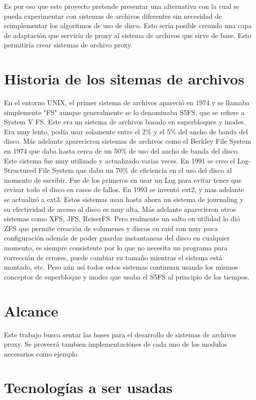 Es por eso que este proyecto pretende presentar una alternativa con la cual se pueda experimentar con sistemas de archivos diferentes sin necesidad de reimplementar los algoritmos de uso de disco. Esto sería posible creando una capa de adaptación que serviría de proxy al sistema de archivos que sirve de base. Esto permitiría crear sistemas de archivo proxy.


\section{Historia de los sitemas de archivos}

En el entorno UNIX, el primer sistema de archivos apareció en 1974 y se llamaba simplemente "FS" aunque generalmente se lo denominaba S5FS, que se refiere a System V FS. Este era un sistema de archivos basado en superbloques y inodes. Era muy lento, podía usar solamente entre el 2\% y el 5\% del ancho de banda del disco. Más adelante aparecieron sistemas de archivos como el Berkley File System en 1974 que daba hasta cerca de un 50\% de uso del ancho de banda del disco. Este sistema fue muy utilizado y actualizado varias veces. En 1991 se creo el Log-Structured File System que daba un 70\% de eficiencia en el uso del disco al momento de escribir. Fue de los primeros en usar un Log para evitar tener que revisar todo el disco en casos de fallos. En 1993 se inventó ext2, y mas adelante se actualizó a ext3. Estos sistemas usan hasta ahora un sistema de journaling y su efectividad de acceso al disco es muy alta. Más adelante aparecieron otros sistemas como XFS, JFS, ReiserFS. Pero realmente un salto en utilidad lo dió ZFS que permite creación de volumenes y discos en raid con muy poca configuración además de poder guardar instantaneas del disco en cualquier momento, es siempre consistente por lo que no necesita un programa para corrección de errores, puede cambiar su tamaño mientras el sistema está montado, etc. Pero aún así todos estos sistemas continuan usando los mismos conceptos de superbloque y inodes que usaba el S5FS al principio de los tiempos.


\section{Alcance}

Este trabajo busca sentar las bases para el desarrollo de sistemas de archivos proxy. Se proveerá tambien implementaciónes de cada uno de los modulos necesarios como ejemplo.


\section{Tecnologías a ser usadas}

